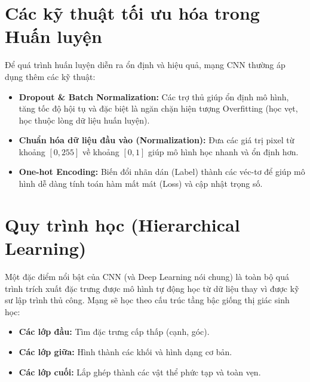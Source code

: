 \documentclass[12pt,a4paper]{article}
\begin{document}
\section{Các kỹ thuật tối ưu hóa trong Huấn luyện}
Để quá trình huấn luyện diễn ra ổn định và hiệu quả, mạng CNN thường áp dụng thêm các kỹ thuật:
\begin{itemize}
    \item \textbf{Dropout \& Batch Normalization:} Các trợ thủ giúp ổn định mô hình, tăng tốc độ hội tụ và đặc biệt là ngăn chặn hiện tượng Overfitting (học vẹt, học thuộc lòng dữ liệu huấn luyện).
    \item \textbf{Chuẩn hóa dữ liệu đầu vào (Normalization):} Đưa các giá trị pixel từ khoảng $[0, 255]$ về khoảng $[0, 1]$ giúp mô hình học nhanh và ổn định hơn.
    \item \textbf{One-hot Encoding:} Biến đổi nhãn dán (Label) thành các véc-tơ để giúp mô hình dễ dàng tính toán hàm mất mát (Loss) và cập nhật trọng số.
\end{itemize}

\section{Quy trình học (Hierarchical Learning)}
Một đặc điểm nổi bật của CNN (và Deep Learning nói chung) là toàn bộ quá trình trích xuất đặc trưng được mô hình tự động học từ dữ liệu thay vì được kỹ sư lập trình thủ công. Mạng sẽ học theo cấu trúc tầng bậc giống thị giác sinh học:
\begin{itemize}
    \item \textbf{Các lớp đầu:} Tìm đặc trưng cấp thấp (cạnh, góc).
    \item \textbf{Các lớp giữa:} Hình thành các khối và hình dạng cơ bản.
    \item \textbf{Các lớp cuối:} Lắp ghép thành các vật thể phức tạp và toàn vẹn.
\end{itemize}
\end{document}

